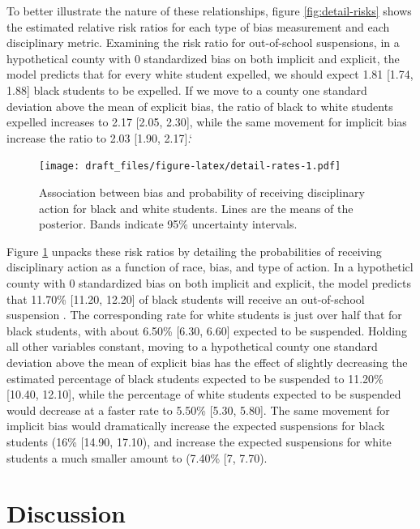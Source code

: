 \documentclass[english,floatsintext,man]{apa6}
\theoremstyle{definition}
\theoremstyle{definition}
\theoremstyle{remark}
\begin{document}
To better illustrate the nature of these relationships, figure
\ref{fig:detail-risks} shows the estimated relative risk ratios for each
type of bias measurement and each disciplinary metric. Examining the
risk ratio for out-of-school suspensions, in a hypothetical county with
0 standardized bias on both implicit and explicit, the model predicts
that for every white student expelled, we should expect 1.81 {[}1.74,
1.88{]} black students to be expelled. If we move to a county one
standard deviation above the mean of explicit bias, the ratio of black
to white students expelled increases to 2.17 {[}2.05, 2.30{]}, while the
same movement for implicit bias increase the ratio to 2.03 {[}1.90,
2.17{]}.`

\begin{figure}
\centering
\texttt{[image: draft\_files/figure-latex/detail-rates-1.pdf]}
\caption{\label{fig:detail-rates}Association between bias and probability of
receiving disciplinary action for black and white students. Lines are
the means of the posterior. Bands indicate 95\% uncertainty intervals.}
\end{figure}

Figure \ref{fig:detail-rates} unpacks these risk ratios by detailing the
probabilities of receiving disciplinary action as a function of race,
bias, and type of action. In a hypotheticl county with 0 standardized
bias on both implicit and explicit, the model predicts that 11.70\%
{[}11.20, 12.20{]} of black students will receive an out-of-school
suspension . The corresponding rate for white students is just over half
that for black students, with about 6.50\% {[}6.30, 6.60{]} expected to
be suspended. Holding all other variables constant, moving to a
hypothetical county one standard deviation above the mean of explicit
bias has the effect of slightly decreasing the estimated percentage of
black students expected to be suspended to 11.20\% {[}10.40, 12.10{]},
while the percentage of white students expected to be suspended would
decrease at a faster rate to 5.50\% {[}5.30, 5.80{]}. The same movement
for implicit bias would dramatically increase the expected suspensions
for black students (16\% {[}14.90, 17.10), and increase the expected
suspensions for white students a much smaller amount to (7.40\% {[}7,
7.70).

\section{Discussion}\label{discussion}

\newpage
\end{document}
